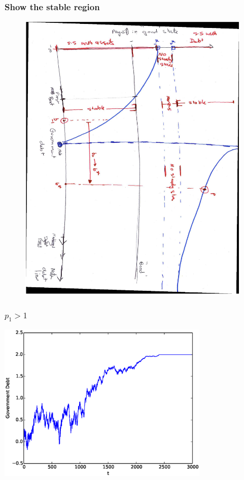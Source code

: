 \documentclass{beamer}
\begin{document}
 
\begin{frame}
   \frametitle{Show the stable region}
	\begin{figure}
		\begin{center}
		\includegraphics[scale=.3,angle=90]{Images/tempGraph.eps}
	\end{center}	
	\end{figure}

  \end{frame}

 
 \begin{frame}

	\frametitle{$p_1 > 1$}
	\begin{center}
	\includegraphics[width=4in]{Images/port1.eps}
	\end{center}
\end{frame}
\end{document}
